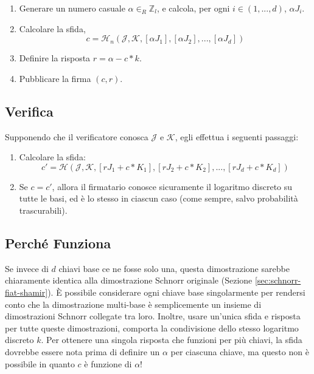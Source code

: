 \begin{enumerate}
	\item Generare un numero casuale $\alpha \in_R \mathbb{Z}_l$, e calcola, per ogni $i \in (1,...,d)$, $\alpha J_i$.
	\item Calcolare la sfida,\vspace{.175cm}
	\[c = \mathcal{H}_n(\mathcal{J},\mathcal{K},[\alpha J_1],[\alpha J_2],...,[\alpha J_d])\]
	\item Definire la risposta $r = \alpha - c*k$.
	\item Pubblicare la firma $(c, r)$.
\end{enumerate}


\subsection*{Verifica}

Supponendo che il verificatore conosca $\mathcal{J}$ e $\mathcal{K}$, egli effettua i seguenti passaggi:

\begin{enumerate}
	\item Calcolare la sfida:\vspace{.175cm}
	\[c' = \mathcal{H}(\mathcal{J},\mathcal{K},[r J_1 + c*K_1],[r J_2 + c*K_2],...,[r J_d + c*K_d])\]
	\item Se $c = c'$, allora il firmatario conosce sicuramente il logaritmo discreto su tutte le basi, ed è lo stesso in ciascun caso (come sempre, salvo probabilità trascurabili).
\end{enumerate}


\subsection*{Perché Funziona}

Se invece di $d$ chiavi base ce ne fosse solo una, questa dimostrazione sarebbe chiaramente identica alla dimostrazione Schnorr originale (Sezione \ref{sec:schnorr-fiat-shamir}). È possibile considerare ogni chiave base singolarmente per rendersi conto che la dimostrazione multi-base è semplicemente un insieme di dimostrazioni Schnorr collegate tra loro. Inoltre, usare un'unica sfida e risposta per tutte queste dimostrazioni, comporta la condivisione dello stesso logaritmo discreto $k$. Per ottenere una singola risposta che funzioni per più chiavi, la sfida dovrebbe essere nota prima di definire un $\alpha$ per ciascuna chiave, ma questo non è possibile in quanto $c$ è funzione di $\alpha$!



